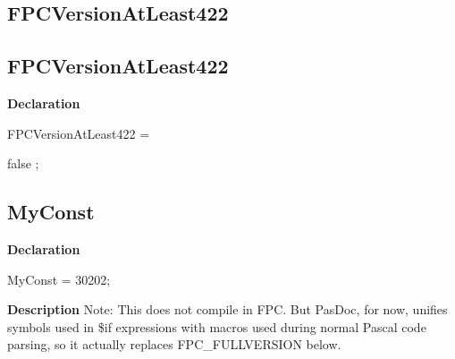 \documentclass{report}
\newif\ifpdf
\begin{document}
\subsection*{\large{\textbf{FPCVersionAtLeast422}}\normalsize\hspace{1ex}\hrulefill}
\else
\subsection*{FPCVersionAtLeast422}
\fi
\label{ok_if_expressions_2-FPCVersionAtLeast422}
\begin{list}{}{
\setlength{\itemindent}{0cm}
\setlength{\listparindent}{0cm}
\setlength{\leftmargin}{\evensidemargin}
\addtolength{\leftmargin}{\tmplength}
\settowidth{\labelsep}{X}
\addtolength{\leftmargin}{\labelsep}
\setlength{\labelwidth}{\tmplength}
}
\item[\textbf{Declaration}\hfill]
\ifpdf
\begin{flushleft}
\fi
\begin{ttfamily}
FPCVersionAtLeast422 =

false
;\end{ttfamily}

\ifpdf
\end{flushleft}
\fi

\end{list}
\ifpdf
\subsection*{\large{\textbf{MyConst}}\normalsize\hspace{1ex}\hrulefill}
\else
\subsection*{MyConst}
\fi
\label{ok_if_expressions_2-MyConst}
\begin{list}{}{
\setlength{\itemindent}{0cm}
\setlength{\listparindent}{0cm}
\setlength{\leftmargin}{\evensidemargin}
\addtolength{\leftmargin}{\tmplength}
\settowidth{\labelsep}{X}
\addtolength{\leftmargin}{\labelsep}
\setlength{\labelwidth}{\tmplength}
}
\item[\textbf{Declaration}\hfill]
\ifpdf
\begin{flushleft}
\fi
\begin{ttfamily}
MyConst = 30202;\end{ttfamily}

\ifpdf
\end{flushleft}
\fi

\par
\item[\textbf{Description}]
Note: This does not compile in FPC. But PasDoc, for now, unifies symbols used in {\$}if expressions with macros used during normal Pascal code parsing, so it actually replaces FPC{\_}FULLVERSION below.

\end{list}
\end{document}

